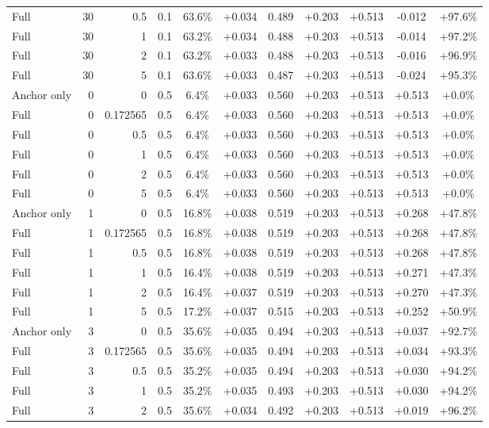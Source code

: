 \begin{table}[htbp]
\begin{tabular}{lrrrccccccc}
Full & 30 & 0.5 & 0.1 & 63.6\% & +0.034 & 0.489 & +0.203 & +0.513 & -0.012 & +97.6\% \\
Full & 30 & 1 & 0.1 & 63.2\% & +0.034 & 0.488 & +0.203 & +0.513 & -0.014 & +97.2\% \\
Full & 30 & 2 & 0.1 & 63.2\% & +0.033 & 0.488 & +0.203 & +0.513 & -0.016 & +96.9\% \\
Full & 30 & 5 & 0.1 & 63.6\% & +0.033 & 0.487 & +0.203 & +0.513 & -0.024 & +95.3\% \\
Anchor only & 0 & 0 & 0.5 & 6.4\% & +0.033 & 0.560 & +0.203 & +0.513 & +0.513 & +0.0\% \\
Full & 0 & 0.172565 & 0.5 & 6.4\% & +0.033 & 0.560 & +0.203 & +0.513 & +0.513 & +0.0\% \\
Full & 0 & 0.5 & 0.5 & 6.4\% & +0.033 & 0.560 & +0.203 & +0.513 & +0.513 & +0.0\% \\
Full & 0 & 1 & 0.5 & 6.4\% & +0.033 & 0.560 & +0.203 & +0.513 & +0.513 & +0.0\% \\
Full & 0 & 2 & 0.5 & 6.4\% & +0.033 & 0.560 & +0.203 & +0.513 & +0.513 & +0.0\% \\
Full & 0 & 5 & 0.5 & 6.4\% & +0.033 & 0.560 & +0.203 & +0.513 & +0.513 & +0.0\% \\
Anchor only & 1 & 0 & 0.5 & 16.8\% & +0.038 & 0.519 & +0.203 & +0.513 & +0.268 & +47.8\% \\
Full & 1 & 0.172565 & 0.5 & 16.8\% & +0.038 & 0.519 & +0.203 & +0.513 & +0.268 & +47.8\% \\
Full & 1 & 0.5 & 0.5 & 16.8\% & +0.038 & 0.519 & +0.203 & +0.513 & +0.268 & +47.8\% \\
Full & 1 & 1 & 0.5 & 16.4\% & +0.038 & 0.519 & +0.203 & +0.513 & +0.271 & +47.3\% \\
Full & 1 & 2 & 0.5 & 16.4\% & +0.037 & 0.519 & +0.203 & +0.513 & +0.270 & +47.3\% \\
Full & 1 & 5 & 0.5 & 17.2\% & +0.037 & 0.515 & +0.203 & +0.513 & +0.252 & +50.9\% \\
Anchor only & 3 & 0 & 0.5 & 35.6\% & +0.035 & 0.494 & +0.203 & +0.513 & +0.037 & +92.7\% \\
Full & 3 & 0.172565 & 0.5 & 35.6\% & +0.035 & 0.494 & +0.203 & +0.513 & +0.034 & +93.3\% \\
Full & 3 & 0.5 & 0.5 & 35.2\% & +0.035 & 0.494 & +0.203 & +0.513 & +0.030 & +94.2\% \\
Full & 3 & 1 & 0.5 & 35.2\% & +0.035 & 0.493 & +0.203 & +0.513 & +0.030 & +94.2\% \\
Full & 3 & 2 & 0.5 & 35.6\% & +0.034 & 0.492 & +0.203 & +0.513 & +0.019 & +96.2\% \\

\end{tabular}
\end{table}
